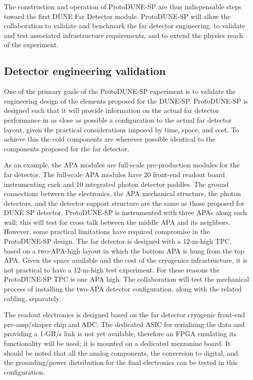 The construction and operation of ProtoDUNE-SP are thus indispensable steps toward the first DUNE Far Detector module. ProtoDUNE-SP will allow the collaboration to validate and benchmark the far detector engineering, to validate and test associated infrastructure requirements, and to extend the physics reach of the experiment. 




\subsection{Detector engineering validation}  

One of the primary goals of the ProtoDUNE-SP experiment is to validate the engineering design of the elements proposed for the  %
DUNE-SP. 
ProtoDUNE-SP is designed such that it will provide information on the actual far detector performance in as close as possible a configuration to the actual far detector layout, given the practical considerations imposed by time, space, and cost. To achieve this the cold components are wherever possible identical to the components proposed for the far detector. 

As an example, the APA modules are full-scale pre-production modules for the far detector. The full-scale APA modules have 20 front-end readout board instrumenting each and 10 integrated photon detector paddles. The ground connections between the electronics, the APA mechanical structure, the photon detectors, and the detector support structure are the same as those proposed for DUNE SP detector. ProtoDUNE-SP is instrumented with three APAs along each wall; this will test for %
cross talk between the middle APA and its neighbors. However, some practical limitations have required compromise in the ProtoDUNE-SP design. The far detector is designed with a 12-m-high TPC, based on a two-APA-high layout in which the bottom APA is hung from the top APA. Given the space available and %
the cost of the cryogenics infrastructure, it is not practical to have a 12-m-high test experiment. For these reasons the ProtoDUNE-SP TPC is one APA high. The collaboration will test the mechanical process of installing the two-APA detector configuration, along with the related cabling, separately.

The readout electronics is designed based on the far detector cryogenic front-end pre-amp/shaper chip and ADC.  The dedicated ASIC for serializing the data and providing a 1-GB/s link is not yet available, therefore an FPGA emulating its functionality will be used; it is mounted on a dedicated mezzanine board. It should be noted that all the analog components, the conversion to digital, and the grounding/power distribution for the final electronics can be tested in this configuration. 

